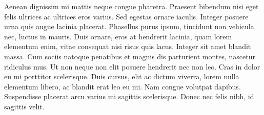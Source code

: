 Aenean dignissim mi mattis neque congue pharetra. Praesent bibendum nisi eget felis ultrices ac ultrices eros varius. Sed egestas ornare iaculis. Integer posuere urna quis augue lacinia placerat. Phasellus purus ipsum, tincidunt non vehicula nec, luctus in mauris. Duis ornare, eros at hendrerit lacinia, quam lorem elementum enim, vitae consequat nisi risus quis lacus. Integer sit amet blandit massa. Cum sociis natoque penatibus et magnis dis parturient montes, nascetur ridiculus mus. Ut non neque non elit posuere hendrerit nec non leo. Cras in dolor eu mi porttitor scelerisque. Duis cursus, elit ac dictum viverra, lorem nulla elementum libero, ac blandit erat leo eu mi. Nam congue volutpat dapibus. Suspendisse placerat arcu varius mi sagittis scelerisque. Donec nec felis nibh, id sagittis velit.

\cite{van1999cluster}
\cite{url:yoga}


